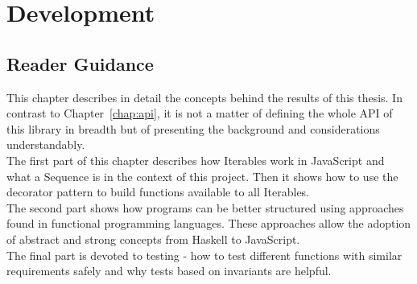 \chapter{Development} %
\label{chap:development}

\section*{Reader Guidance} %
\label{sec:dev_reader_guidance}
This chapter describes in detail the concepts behind the results of this
thesis. In contrast to Chapter~\ref{chap:api}, it is not a matter of defining
the whole API of this library in breadth but of presenting the background and
considerations understandably. \\
The first part of this chapter describes how Iterables work in JavaScript and
what a Sequence is in the context of this project. Then it shows how to use the
decorator pattern to build functions available to all Iterables. \\ 
The second part shows how programs can be better structured using approaches
found in functional programming languages. These approaches allow the adoption
of abstract and strong concepts from Haskell to JavaScript. \\ 
The final part is devoted to testing - how to test different functions with
similar requirements safely and why tests based on invariants are helpful.










